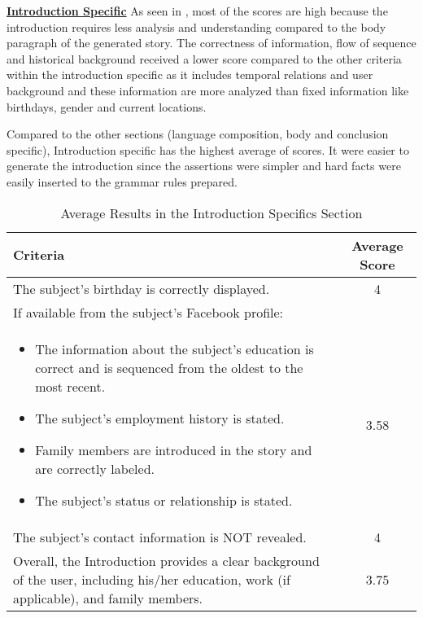 \underline{\textbf{Introduction Specific}}
As seen in , most of the scores are high because the introduction requires less analysis and understanding compared to the body paragraph of the generated story. The correctness of information, flow of sequence and historical background received a lower score compared to the other criteria within the introduction specific as it includes temporal relations and user background and these information are more analyzed than fixed information like birthdays, gender and current locations.

Compared to the other sections (language composition, body and conclusion specific), Introduction specific has the highest average of scores. It were easier to generate the introduction since the assertions were simpler and hard facts were easily inserted to the grammar rules prepared.

\begin{table}[ph!]   %
	\centering
	\caption{Average Results in the Introduction Specifics Section} \vspace{0.25em}
	\begin{tabular}{|p{2.5in}|c|} \hline
		\centering Criteria & Average Score \\ \hline
		The subject’s birthday is correctly displayed. & 4 \\ \hline
		If available from the subject’s Facebook profile: \\ \begin{itemize}
		\item The information about the subject’s education is correct and is sequenced from the oldest to the most recent.
		\item The subject’s employment history is stated.
		\item Family members are introduced in the story and are correctly labeled.
		\item The subject’s status or relationship is stated. \end{itemize} & 3.58 \\ \hline
		The subject’s contact information is NOT revealed. & 4 \\ \hline
		Overall, the Introduction provides a clear background of the user, including his/her education, work (if applicable), and family members. & 3.75 \\ \hline
	\end{tabular}
	\label{tab:criteria2}
\end{table}


